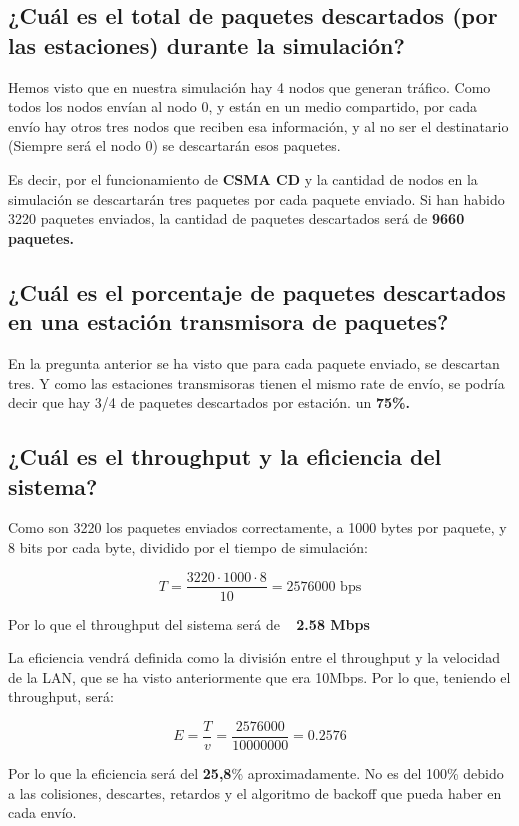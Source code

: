 \documentclass{article}
\begin{document}
\subsection{¿Cuál es el total de paquetes descartados (por las estaciones) durante la simulación?}

Hemos visto que en nuestra simulación hay 4 nodos que generan tráfico. Como todos los nodos envían al nodo 0, y están en un medio compartido, por cada envío hay otros tres nodos que reciben esa información, y al no ser el destinatario (Siempre será el nodo 0) se descartarán esos paquetes.

Es decir, por el funcionamiento de \textbf{CSMA CD} y la cantidad de nodos en la simulación se descartarán tres paquetes por cada paquete enviado. Si han habido 3220 paquetes enviados, la cantidad de paquetes descartados será de \textbf{9660 paquetes.}

\subsection{¿Cuál es el porcentaje de paquetes descartados en una estación transmisora de paquetes?}

En la pregunta anterior se ha visto que para cada paquete enviado, se descartan tres. Y como las estaciones transmisoras tienen el mismo rate de envío, se podría decir que hay 3/4 de paquetes descartados por estación. un \textbf{75\%.}

\subsection{¿Cuál es el throughput y la eficiencia del sistema?}

Como son 3220 los paquetes enviados correctamente, a 1000 bytes por paquete, y 8 bits por cada byte, dividido por el tiempo de simulación:

\[ T = \frac{3220 \cdot 1000 \cdot 8}{10} = 2576000 \text{ bps} \]

Por lo que el throughput del sistema será de ~\textbf{ 2.58 Mbps}

La eficiencia vendrá definida como la división entre el throughput y la velocidad de la LAN, que se ha visto anteriormente que era 10Mbps. Por lo que, teniendo el throughput, será:

\[E = \frac{T}{v} = \frac{2576000}{10000000} = 0.2576
\]

Por lo que la eficiencia será del \textbf{25,8}\% aproximadamente. No es del 100\% debido a las colisiones, descartes, retardos y el algoritmo de backoff que pueda haber en cada envío.
\end{document}
